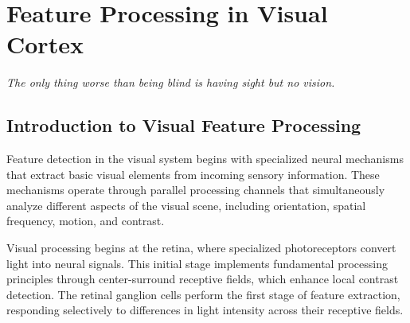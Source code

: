 \chapter{Feature Processing in Visual Cortex}

\epigraph{\textit{The only thing worse than being blind is having sight but no vision.}}{}

\minitoc
\newpage
\section{Introduction to Visual Feature Processing}
Feature detection in the visual system begins with specialized neural mechanisms that extract basic visual elements from incoming sensory information. These mechanisms operate through parallel processing channels that simultaneously analyze different aspects of the visual scene, including orientation, spatial frequency, motion, and contrast.

Visual processing begins at the retina, where specialized photoreceptors convert light into neural signals. This initial stage implements fundamental processing principles through center-surround receptive fields, which enhance local contrast detection. The retinal ganglion cells perform the first stage of feature extraction, responding selectively to differences in light intensity across their receptive fields.

